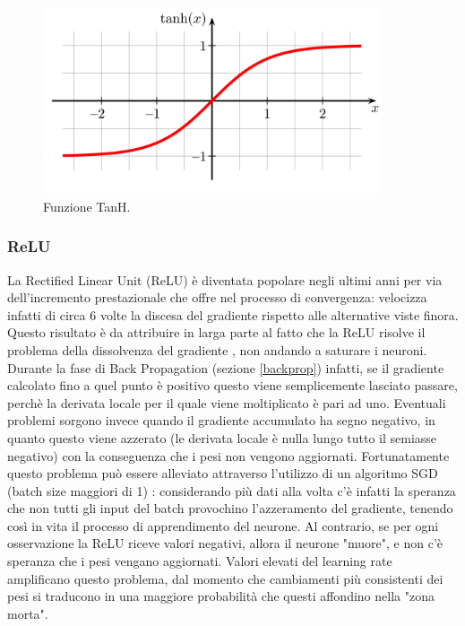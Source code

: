 \begin{figure}[htb]
	\centering
	\includegraphics[width = 100mm]{images/tanh.png}
	\caption{Funzione TanH.}
	\label{img:tanh}
\end{figure}

\subsubsection{ReLU}
La Rectified Linear Unit (ReLU) è diventata popolare negli ultimi anni per via dell'incremento prestazionale che offre nel processo di convergenza: velocizza infatti di circa 6 volte la discesa del gradiente rispetto alle alternative viste finora. Questo risultato è da attribuire in larga parte al fatto che la ReLU risolve il problema della dissolvenza del gradiente \cite{glorot2010understanding}, non andando a saturare i neuroni. Durante la fase di Back Propagation (sezione \ref{backprop}) infatti, se il gradiente calcolato fino a quel punto è positivo questo viene semplicemente lasciato passare, perchè la derivata locale per il quale viene moltiplicato è pari ad uno. Eventuali problemi sorgono invece quando il gradiente accumulato ha segno negativo, in quanto questo viene azzerato (le derivata locale è nulla lungo tutto il semiasse negativo) con la conseguenza che i pesi non vengono aggiornati. Fortunatamente questo problema può essere alleviato attraverso l'utilizzo di un algoritmo SGD (batch size maggiori di 1) \cite{ioffe2015batch}: considerando più dati alla volta c'è infatti la speranza che non tutti gli input del batch provochino l'azzeramento del gradiente, tenendo così in vita il processo di apprendimento del neurone. Al contrario, se per ogni osservazione la ReLU riceve valori negativi, allora il neurone "muore", e non c'è speranza che i pesi vengano aggiornati. Valori elevati del learning rate amplificano questo problema, dal momento che cambiamenti più consistenti dei pesi si traducono in una maggiore probabilità che questi affondino nella "zona morta".
